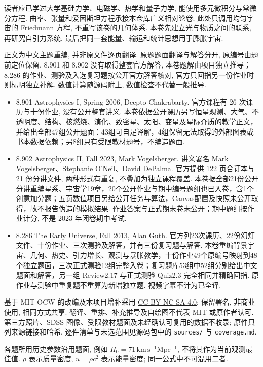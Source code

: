 读者应已学过大学基础力学、电磁学、热学和量子力学, 能使用多元微积分与常微分方程. 曲率、张量和爱因斯坦方程承接本仓库广义相对论卷; 此处只调用均匀宇宙的 Friedmann 方程, 不重写该卷的几何体系. 本卷先建立光与物质之间的联系, 再研究自引力系统, 最后把同一套能量、输运和统计思想用于膨胀宇宙.

正文为中文主题重编, 并非原文件逐页翻译. 原题题面翻译与解答分开, 原编号由题前定位保留. 8.901 和 8.902 没有取得整套官方解答, 本卷题解由项目独立推导；8.286 的作业、测验及入选复习题按公开官方解答核对, 官方只回指另一份作业时则标明独立补解. 数值计算随源码附上, 数值检查不代替一般推导.

\begin{itemize}
\item 8.901 Astrophysics I, Spring 2006, Deepto Chakrabarty. 官方课程有 26 次课历与十份作业, 没有公开整套讲义. 本卷依据公开课历另写恒星观测、大气、不透明度、结构、核燃烧、演化、致密星、太阳、变星及星际介质的教学正文，并给出全部47组公开题面：43组可自足译解，4组保留无法取得的外部图表或书本数据依赖；另8组只有受限教材题号，不编造题面.
\item 8.902 Astrophysics II, Fall 2023, Mark Vogelsberger. 讲义署名 Mark Vogelsberger、Stephanie O'Neil、David DePalma. 官方提供 122 页合订本与 21 份分讲文件, 两种形式有重复, 不叠加为独立课程覆盖. 本卷据全部21份公开分讲重编星系、宇宙学19章，20个公开作业与期中编号题组也已入卷，含1个创意加分题；五页数值项目另给公开任务与算法，Canvas配置及快照未公开取得，故不报告伪造的模拟结果. 作业答案与正式期末卷未公开；期中题组按作业计分, 不是 2023 年闭卷期中考试.
\item 8.286 The Early Universe, Fall 2013, Alan Guth. 官方列23次课历、22份幻灯文件、十份作业、三次测验及解答，并有三份复习题与解答. 本卷重编背景宇宙、几何、热史、引力增长、观测与暴胀教学，十份作业49个原编号映射到48个独立题面，三次正式测验12组完整入卷；复习题库53组中52组分别给出中文题面和解答，另一组 Review2.17 与正式测验 Quiz2.3 完全相同并精确回指. 原作业与测验中重复题不重算为新增独立题. 视频字幕不计为已全译.
\end{itemize}

基于 MIT OCW 的改编及本项目增补采用 \href{https://creativecommons.org/licenses/by-nc-sa/4.0/}{CC BY-NC-SA 4.0}: 保留署名, 非商业使用, 相同方式共享. 翻译、重排、补充推导及自绘图不代表 MIT 或原作者认可. 第三方照片、SDSS 图像、受限教材题面及未经确认可复用的数据不收录; 原件只列来源链接和哈希. 逐件清单与未选范围见源码包中的 \texttt{sources/} 与 \texttt{coverage.md}.

各题所用历史参数沿用题面, 例如 $H_0=71\,\mathrm{km\,s^{-1}Mpc^{-1}}$, 不将其作为当前观测最佳值. $\rho$ 表示质量密度, $u=\rho c^2$ 表示能量密度; 同一公式中不可混用二者.
